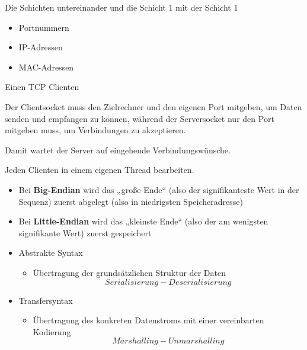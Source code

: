 
Die Schichten untereinander und die Schicht 1 mit der Schicht 1

\begin{itemize}
    \item Portnummern
    \item IP-Adressen
    \item MAC-Adressen
\end{itemize}

Einen TCP Clienten

Der Clientsocket muss den Zielrechner und den eigenen Port mitgeben,
um Daten senden und empfangen zu können, während der Serversocket nur den Port mitgeben muss,
um Verbindungen zu akzeptieren.


Damit wartet der Server auf eingehende Verbindungswünsche.

Jeden Clienten in einem eigenen Thread bearbeiten.

\begin{itemize}
    \item Bei \textbf{Big-Endian} wird das „große Ende“ (also der signifikanteste Wert in der Sequenz) zuerst abgelegt (also in niedrigsten Speicheradresse)
    \item Bei \textbf{Little-Endian} wird das „kleinste Ende“ (also der am wenigsten signifikante Wert) zuerst gespeichert
\end{itemize}

\begin{itemize}
    \item Abstrakte Syntax
    \begin{itemize}
        \item Übertragung der grundsätzlichen Struktur der Daten \[Serialisierung - Deserialisierung\]
    \end{itemize}
    \item Transfersyntax
    \begin{itemize}
        \item Übertragung des konkreten Datenstroms mit einer vereinbarten Kodierung \[Marshalling - Unmarshalling\]
    \end{itemize}
\end{itemize}

